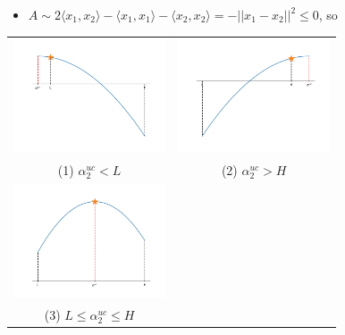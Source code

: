 \documentclass{beamer}
\begin{document}
\begin{frame}
\begin{itemize}
\item $A \sim2\langle x_1, x_2\rangle - \langle x_1, x_1\rangle - \langle x_2, x_2\rangle = -||x_1 - x_2||^2 \leq 0$, so
\end{itemize}
\begin{tabular}{cc}
\includegraphics[width=4.5cm]{images/img13.png} & \includegraphics[width=4.5cm]{images/img12.png} \\
(1) $\alpha_2^{uc} < L$ & (2) $\alpha_2^{uc} > H$ \\
\includegraphics[width=4.5cm]{images/img11.png} &\\
(3) $L \leq \alpha_2^{uc} \leq H$ & \\

\end{tabular}







\end{frame}
\end{document}
